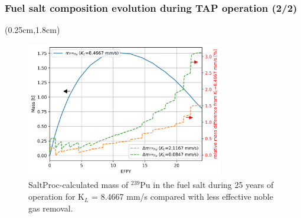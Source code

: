 \begin{frame}
\frametitle{Fuel salt composition evolution during TAP operation (2/2)}
\begin{textblock*}{12.25cm}(0.25cm,1.8cm) %
	\begin{figure}[htp!] %
		\centering
		\includegraphics[width=0.77\textwidth]{../dissertation/figures/ch4/eps/pu239.png}
		\vspace{-1mm}
		\caption{SaltProc-calculated mass of $^{239}$Pu in the fuel salt 
		during 25 years of operation for K$_L$ = 8.4667 mm/s compared with 
		less effective noble gas removal.}
	\end{figure}
\end{textblock*}
\end{frame}


